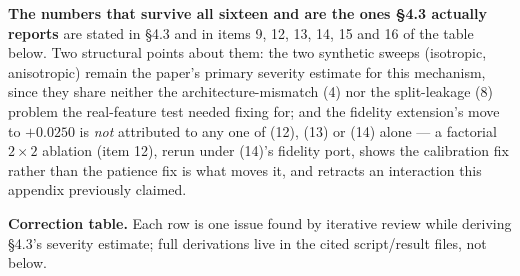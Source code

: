 \documentclass[10pt]{article} %
\begin{document}
\textbf{The numbers that survive all sixteen and are the ones §4.3
actually reports} are stated in §4.3 and in items 9, 12, 13, 14, 15 and 16 of
the table below. Two structural points about them: the two synthetic sweeps
(isotropic, anisotropic) remain the paper's primary severity estimate
for this mechanism, since they share neither the architecture-mismatch
(4) nor the split-leakage (8) problem the real-feature test needed fixing
for; and the fidelity extension's move to $+0.0250$ is \emph{not}
attributed to any one of (12), (13) or (14) alone --- a factorial
$2\times2$ ablation (item 12), rerun under (14)'s fidelity port, shows the
calibration fix rather than the patience fix is what moves it, and retracts
an interaction this appendix previously claimed.

\textbf{Correction table.} Each row is one issue found by iterative
review while deriving §4.3's severity estimate; full derivations live in
the cited script/result files, not below.
\end{document}
